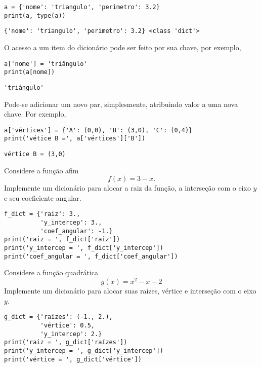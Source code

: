 \begin{lstlisting}
a = {'nome': 'triangulo', 'perimetro': 3.2}
print(a, type(a))
\end{lstlisting}

\begin{verbatim}
{'nome': 'triangulo', 'perimetro': 3.2} <class 'dict'>
\end{verbatim}


O acesso a um item do dicionário pode ser feito por sua chave, por exemplo,

\begin{lstlisting}
a['nome'] = 'triângulo'
print(a[nome])
\end{lstlisting}

\begin{verbatim}
'triângulo'
\end{verbatim}

Pode-se adicionar um novo par, simplesmente, atribuindo valor a uma nova chave. Por exemplo,

\begin{lstlisting}
a['vértices'] = {'A': (0,0), 'B': (3,0), 'C': (0,4)}
print('vétice B =', a['vértices']['B'])
\end{lstlisting}

\begin{verbatim}
vértice B = (3,0)
\end{verbatim}


\begin{exer}
  Considere a função afim
  \begin{equation}
    f(x) = 3 - x.
  \end{equation}
  Implemente um dicionário para alocar a raiz da função, a interseção com o eixo $y$ e seu coeficiente angular.
\end{exer}
\begin{resp}

\begin{lstlisting}
f_dict = {'raiz': 3.,
          'y_intercep': 3.,
          'coef_angular': -1.}
print('raiz = ', f_dict['raiz'])
print('y_intercep = ', f_dict['y_intercep'])
print('coef_angular = ', f_dict['coef_angular'])
\end{lstlisting}

\end{resp}

\begin{exer}
  Considere a função quadrática
  \begin{equation}
    g(x) = x^2 - x - 2
  \end{equation}
  Implemente um dicionário para alocar suas raízes, vértice e interseção com o eixo $y$.
\end{exer}
\begin{resp}

\begin{lstlisting}
g_dict = {'raízes': (-1., 2.),
          'vértice': 0.5,
          'y_intercep': 2.}
print('raiz = ', g_dict['raízes'])
print('y_intercep = ', g_dict['y_intercep'])
print('vértice = ', g_dict['vértice'])
\end{lstlisting}

\end{resp}
